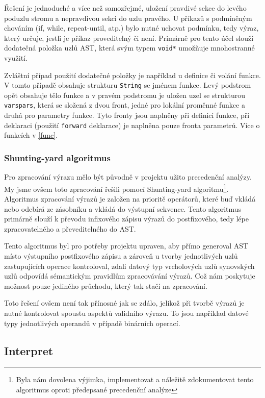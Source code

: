 \documentclass[12pt,a4paper,titlepage,final]{article}
\begin{document}
Řešení je jednoduché a více než samozřejmé, uložení pravdivé sekce do levého
poduzlu stromu a nepravdivou sekci do uzlu pravého. U příkazů s podmíněným
chováním (if, while, repeat-until, atp.) bylo nutné uchovat podmínku, tedy výraz,
který určuje, jestli je příkaz proveditelný či není. Primárně pro tento účel
slouží dodatečná položka uzlů AST, která svým typem \verb|void*| umožňuje
mnohostranné využití. 

Zvláštní případ použití dodatečné položky je například u definice či volání funkce.
V tomto případě obsahuje strukturu \verb|String| se jménem funkce. Levý podstrom
opět obsahuje tělo funkce a v pravém podstromu je uložen uzel se strukturou \verb|varspars|,
která se složená z dvou front, jedné pro lokální proměnné funkce a druhá pro
parametry funkce. Tyto fronty jsou naplněny při definici funkce, při deklaraci
(použití \verb|forward| deklarace) je naplněna pouze fronta parametrů. Více o funkcích
v \ref{func}.

\subsubsection{Shunting-yard algoritmus}
\label{sya}
Pro zpracování výrazu mělo být původně v projektu užito precedenční analýzy. My jsme ovšem toto zpracování řešili pomocí Shunting-yard algoritmu\footnote{Byla nám
dovolena výjimka, implementovat a náležitě zdokumentovat tento algoritmus oproti předepsané
precedenční analýze}. Algoritmus zpracování výrazů je založen na prioritě operátorů, které buď vkládá
nebo odebírá ze zásobníku a vkládá do výstupní sekvence. Tento algoritmus primárně
slouží k převodu infixového zápisu výrazů do postfixového, tedy lépe zpracovatelného
a převeditelného do AST.

Tento algoritmus byl pro potřeby projektu upraven, aby přímo generoval AST místo
výstupního postfixového zápisu a zároveň u tvorby jednotlivých uzlů zastupujících
operace kontroloval, zdali datový typ vrcholových uzlů synovských uzlů odpovídá
sémantickým pravidlům zpracovávání výrazů. Což nám poskytuje možnost pouze jediného průchodu, který tak stačí na zpracování.

Toto řešení ovšem není tak přínosné jak se zdálo, jelikož při tvorbě výrazů je nutné kontrolovat spoustu aspektů validního výrazu. To jsou
například datové typy jednotlivých operandů v případě binárních operací.

\subsection{Interpret} \label{interpret}
\end{document}
